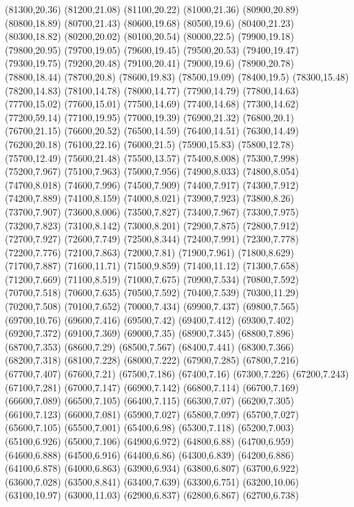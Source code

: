 (81300,20.36)
(81200,21.08)
(81100,20.22)
(81000,21.36)
(80900,20.89)
(80800,18.89)
(80700,21.43)
(80600,19.68)
(80500,19.6)
(80400,21.23)
(80300,18.82)
(80200,20.02)
(80100,20.54)
(80000,22.5)
(79900,19.18)
(79800,20.95)
(79700,19.05)
(79600,19.45)
(79500,20.53)
(79400,19.47)
(79300,19.75)
(79200,20.48)
(79100,20.41)
(79000,19.6)
(78900,20.78)
(78800,18.44)
(78700,20.8)
(78600,19.83)
(78500,19.09)
(78400,19.5)
(78300,15.48)
(78200,14.83)
(78100,14.78)
(78000,14.77)
(77900,14.79)
(77800,14.63)
(77700,15.02)
(77600,15.01)
(77500,14.69)
(77400,14.68)
(77300,14.62)
(77200,59.14)
(77100,19.95)
(77000,19.39)
(76900,21.32)
(76800,20.1)
(76700,21.15)
(76600,20.52)
(76500,14.59)
(76400,14.51)
(76300,14.49)
(76200,20.18)
(76100,22.16)
(76000,21.5)
(75900,15.83)
(75800,12.78)
(75700,12.49)
(75600,21.48)
(75500,13.57)
(75400,8.008)
(75300,7.998)
(75200,7.967)
(75100,7.963)
(75000,7.956)
(74900,8.033)
(74800,8.054)
(74700,8.018)
(74600,7.996)
(74500,7.909)
(74400,7.917)
(74300,7.912)
(74200,7.889)
(74100,8.159)
(74000,8.021)
(73900,7.923)
(73800,8.26)
(73700,7.907)
(73600,8.006)
(73500,7.827)
(73400,7.967)
(73300,7.975)
(73200,7.823)
(73100,8.142)
(73000,8.201)
(72900,7.875)
(72800,7.912)
(72700,7.927)
(72600,7.749)
(72500,8.344)
(72400,7.991)
(72300,7.778)
(72200,7.776)
(72100,7.863)
(72000,7.81)
(71900,7.961)
(71800,8.629)
(71700,7.887)
(71600,11.71)
(71500,9.859)
(71400,11.12)
(71300,7.658)
(71200,7.669)
(71100,8.519)
(71000,7.675)
(70900,7.534)
(70800,7.592)
(70700,7.518)
(70600,7.635)
(70500,7.592)
(70400,7.539)
(70300,11.29)
(70200,7.508)
(70100,7.652)
(70000,7.434)
(69900,7.437)
(69800,7.565)
(69700,10.76)
(69600,7.416)
(69500,7.42)
(69400,7.412)
(69300,7.402)
(69200,7.372)
(69100,7.369)
(69000,7.35)
(68900,7.345)
(68800,7.896)
(68700,7.353)
(68600,7.29)
(68500,7.567)
(68400,7.441)
(68300,7.366)
(68200,7.318)
(68100,7.228)
(68000,7.222)
(67900,7.285)
(67800,7.216)
(67700,7.407)
(67600,7.21)
(67500,7.186)
(67400,7.16)
(67300,7.226)
(67200,7.243)
(67100,7.281)
(67000,7.147)
(66900,7.142)
(66800,7.114)
(66700,7.169)
(66600,7.089)
(66500,7.105)
(66400,7.115)
(66300,7.07)
(66200,7.305)
(66100,7.123)
(66000,7.081)
(65900,7.027)
(65800,7.097)
(65700,7.027)
(65600,7.105)
(65500,7.001)
(65400,6.98)
(65300,7.118)
(65200,7.003)
(65100,6.926)
(65000,7.106)
(64900,6.972)
(64800,6.88)
(64700,6.959)
(64600,6.888)
(64500,6.916)
(64400,6.86)
(64300,6.839)
(64200,6.886)
(64100,6.878)
(64000,6.863)
(63900,6.934)
(63800,6.807)
(63700,6.922)
(63600,7.028)
(63500,8.841)
(63400,7.639)
(63300,6.751)
(63200,10.06)
(63100,10.97)
(63000,11.03)
(62900,6.837)
(62800,6.867)
(62700,6.738)
